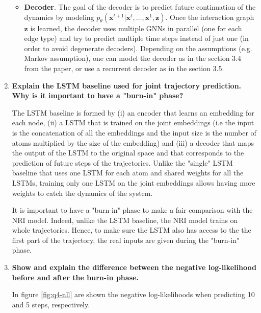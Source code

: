 \documentclass[a4paper, 11pt]{article}
\begin{document}
\begin{enumerate}
\begin{itemize}
	    \item \textbf{Decoder}. The goal of the decoder is to predict future continuation of the dynamics by modeling $p_{\theta} \left( \mathbf{x}^{t+1} | \mathbf{x}^{t}, \dots, \mathbf{x}^{1}, \mathbf{z} \right)$. Once the interaction graph $\mathbf{z}$ is learned, the decoder uses multiple GNNs in parallel (one for each edge type) and try to predict multiple time steps instead of just one (in order to avoid degenerate decoders). Depending on the assumptions (e.g. Markov assumption), one can model the decoder as in the section 3.4 from the paper, or use a recurrent decoder as in the section 3.5.
	\end{itemize}
	
	\item \textbf{Explain the LSTM baseline used for joint trajectory prediction. Why is it important to have a "burn-in" phase?}
	
	The LSTM baseline is formed by (i) an encoder that learns an embedding for each node, (ii) a LSTM that is trained on the joint embeddings (i.e the input is the concatenation of all the embeddings and the input size is the number of atoms multiplied by the size of the embedding) and (iii) a decoder that maps the output of the LSTM to the original space and that corresponds to the prediction of future steps of the trajectories. Unlike the "single" LSTM baseline that uses one LSTM for each atom and shared weights for all the LSTMs, training only one LSTM on the joint embeddings allows having more weights to catch the dynamics of the system.
	
	It is important to have a "burn-in" phase to make a fair comparison with the NRI model. Indeed, unlike the LSTM baseline, the NRI model trains on whole trajectories. Hence, to make sure the LSTM also has access to the the first part of the trajectory, the real inputs are given during the "burn-in" phase.
	
	\item \textbf{Show and explain the difference between the negative log-likelihood before and after the burn-in phase.}
	
	In figure \ref{fig:q4-nll} are shown the negative log-likelihoods when predicting 10 and 5 steps, respectively.
	

\end{enumerate}
\end{document}
